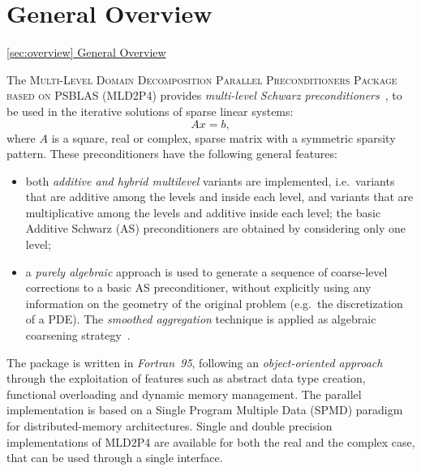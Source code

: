 \section{General Overview\label{sec:overview}}

         {\underline{\ref{sec:overview} General Overview}}

The \textsc{Multi-Level Domain Decomposition Parallel Preconditioners Package based on
PSBLAS (MLD2P4}) provides \emph{multi-level Schwarz preconditioners}~\cite{dd2_96},
to be used in the iterative solutions of sparse linear systems:
\begin{equation} 
Ax=b, 
\label{system1}
\end{equation} 
where $A$ is a square, real or complex, sparse matrix with a symmetric sparsity pattern.
%
%
These preconditioners have the following general features:
\begin{itemize}
\item both \emph{additive and hybrid multilevel} variants are implemented,
i.e.\ variants that are additive among the levels and inside each level, and variants
that are multiplicative among the levels and additive inside each level; the basic Additive Schwarz (AS) preconditioners are obtained by considering only one level;
\item a \emph{purely algebraic} approach is used to
generate a sequence of coarse-level corrections to a basic AS preconditioner, without
explicitly using any information on the geometry of the original problem (e.g.\ the
discretization of a PDE). The \emph{smoothed aggregation} technique is applied
as algebraic coarsening strategy~\cite{BREZINA_VANEK,VANEK_MANDEL_BREZINA}.
\end{itemize}

The package is written in \emph{Fortran~95}, following an
\emph{object-oriented approach} through the exploitation of features
such as abstract data type creation, functional 
overloading and dynamic memory management.%
The parallel implementation is based
on a Single Program Multiple Data (SPMD) paradigm for distributed-memory architectures. 
Single and double precision implementations of MLD2P4 are available for both the
real and the complex case, that can be used through a single interface.



